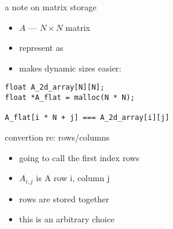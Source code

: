 \begin{frame}[fragile,label=flatMatrix]{a note on matrix storage}
\begin{itemize}
\item $A$ --- $N\times N$ matrix
\item represent as 
\item makes dynamic sizes easier:
\end{itemize}
\lstset{style=small,language=C,escapechar=@}
\begin{lstlisting}
float A_2d_array[N][N];
float *A_flat = malloc(N * N);

A_flat[i * N + j] === A_2d_array[i][j]
\end{lstlisting}
\end{frame}

\begin{frame}{convertion re: rows/columns}
\begin{itemize}
\item going to call the first index rows
\item $A_{i,j}$ is A row i, column j
\item rows are stored together
\vspace{.5cm}
\item this is an arbitrary choice
\end{itemize}
\end{frame}
